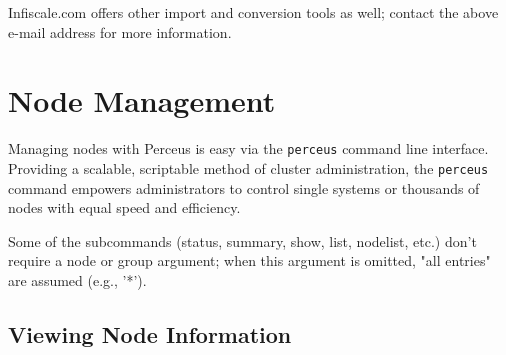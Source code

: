 \documentclass[10pt,letterpaper]{report}
\begin{document}
Infiscale.com offers other import and conversion tools as well; contact the
above e-mail address for more information.

\section{Node Management}

Managing nodes with Perceus is easy via the {\tt perceus} command line
interface.  Providing a scalable, scriptable method of cluster administration,
the {\tt perceus} command empowers administrators to control single systems or
thousands of nodes with equal speed and efficiency.

\noindent Some of the subcommands (status, summary, show, list, nodelist,
etc.) don't require a node or group argument; when this argument is omitted,
"all entries" are assumed (e.g., '*').


\subsection{Viewing Node Information}
\end{document}
